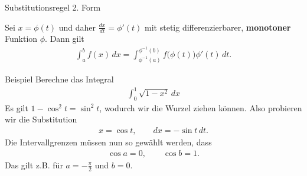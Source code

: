 \begin{frame}{Substitutionsregel 2. Form}
    \begin{block}{}
        Sei $x = \phi(t)$ und daher $\frac{dx}{dt} = \phi'(t)$ mit stetig differenzierbarer, \textbf{monotoner} Funktion $\phi$. Dann gilt
        \begin{gather*}
            \int_{a}^{b} f(x)\,dx =
            \int_{\phi^{-1}(a)}^{\phi^{-1}(b)} f\bigl(\phi(t)\bigr)\phi'(t)\,dt
            .
        \end{gather*}
    \end{block}
\end{frame}


\begin{frame}{Beispiel}
\label{frame:circle}
    Berechne das Integral
    \begin{gather*}
        \int_0^1 \sqrt{1-x^2}\,dx
    \end{gather*}
    \pause
    Es gilt $1-\cos^2 t = \sin^2 t$, wodurch wir die Wurzel ziehen können. Also probieren wir die Substitution
    \begin{gather*}
        x = \cos t,\qquad dx = -\sin t \,dt.
    \end{gather*}
    \pause
    Die Intervallgrenzen müssen nun so gewählt werden, dass
    \begin{gather*}
        \cos a = 0,\qquad \cos b = 1.
    \end{gather*}
    Das gilt z.B. für $a = -\frac\pi2$ und $b = 0$.
\end{frame}

